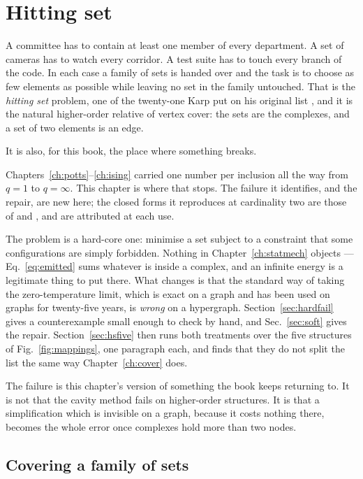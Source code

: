 \chapter{Hitting set}
\label{ch:hittingset}

A committee has to contain at least one member of every department. A set of
cameras has to watch every corridor. A test suite has to touch every branch of
the code. In each case a family of sets is handed over and the task is to choose
as few elements as possible while leaving no set in the family untouched. That
is the \emph{hitting set} problem, one of the twenty-one Karp put on his
original list \citep{karp1972}, and it is the natural higher-order relative of
vertex cover: the sets are the complexes, and a set of two elements is an edge.

It is also, for this book, the place where something breaks.

Chapters~\ref{ch:potts}--\ref{ch:ising} carried one number per inclusion all the
way from $q=1$ to $q=\infty$. This chapter is where that stops.
The failure it identifies, and the repair, are new here; the closed forms it
reproduces at cardinality two are those of \citet{weigt2000} and
\citet{mezard2007}, and are attributed at each use.

The problem is a hard-core one: minimise a set subject to a constraint that some
configurations are simply forbidden. Nothing in Chapter~\ref{ch:statmech}
objects --- Eq.~\eqref{eq:emitted} sums whatever is inside a complex, and an
infinite energy is a legitimate thing to put there. What changes is that the
standard way of taking the zero-temperature limit, which is exact on a graph and
has been used on graphs for twenty-five years, is \emph{wrong} on a hypergraph.
Section~\ref{sec:hardfail} gives a counterexample small enough to check by hand,
and Sec.~\ref{sec:soft} gives the repair. Section~\ref{sec:hsfive} then runs
both treatments over the five structures of Fig.~\ref{fig:mappings}, one
paragraph each, and finds that they do not split the list the same way
Chapter~\ref{ch:cover} does.

The failure is this chapter's version of something the book keeps returning to.
It is not that the cavity method fails on higher-order structures. It is that a
simplification which is invisible on a graph, because it costs nothing there,
becomes the whole error once complexes hold more than two nodes.

\section{Covering a family of sets}
\label{sec:hittingsetdef}

